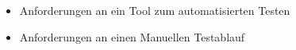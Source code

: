
\begin{itemize}
  \item Anforderungen an ein Tool zum automatisierten Testen
  \item Anforderungen an einen Manuellen Testablauf
\end{itemize}
